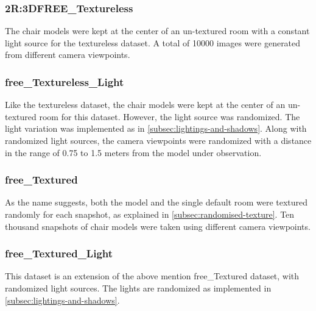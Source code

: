 
\subsubsection{2R:3DFREE\_Textureless}

The chair models were kept at the center of an un-textured room with a constant light source for the textureless dataset.
A total of 10000 images were generated from different camera viewpoints.

\subsubsection{\gls{free}\_Textureless\_Light}

Like the textureless dataset, the chair models were kept at the center of an un-textured room for this dataset.
However, the light source was randomized.
The light variation was implemented as in \autoref{subsec:lightings-and-shadows}.
Along with randomized light sources, the camera viewpoints were randomized with a distance in the range of 0.75 to 1.5 meters from the model under observation.

\subsubsection{\gls{free}\_Textured}

As the name suggests, both the model and the single default room were textured randomly for each snapshot, as explained in \autoref{subsec:randomised-texture}.
Ten thousand snapshots of chair models were taken using different camera viewpoints.

\subsubsection{\gls{free}\_Textured\_Light}

This dataset is an extension of the above mention \gls{free}\_Textured dataset, with randomized light sources.
The lights are randomized as implemented in \autoref{subsec:lightings-and-shadows}.

